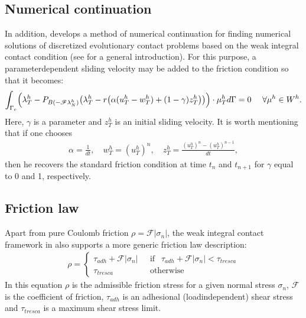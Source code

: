 \documentclass[a4paper,11pt,english]{sphinxmanual}
\begin{document}
\subsection{Numerical continuation}
\label{\detokenize{userdoc/model_contact_friction:numerical-continuation}}
In addition,  develops a method of numerical continuation for finding numerical solutions of discretized evolutionary contact problems based on the weak integral contact condition (see {\hyperref[\detokenize{userdoc/model_continuation:ud-model-continuation}]{}} for a general introduction). For this purpose, a parameter\sphinxhyphen{}dependent sliding velocity may be added to the friction condition so that it becomes:
\begin{equation*}
\begin{split}\displaystyle \int_{\Gamma_c} \Bigl(\lambda^h_T -P_{B(-\mathscr F\lambda^h_N)}\bigl(\lambda^h_T - r\bigl(\alpha(u^h_T-w^h_T)+(1-\gamma)z^h_T\bigr)\bigr)\Bigr)\cdot \mu^h_T d\Gamma = 0 ~~~~ \forall \mu^h \in W^h.\end{split}
\end{equation*}
Here, \(\gamma\) is a parameter and \(z^h_T\) is an initial sliding velocity. It is worth mentioning that if one chooses
\begin{equation*}
\begin{split}\displaystyle \alpha = \frac{1}{dt},\quad w^h_T = (u^h_T)^{n},\quad z^h_T = \frac{(u^h_T)^{n} - (u^h_T)^{n-1}}{dt},\end{split}
\end{equation*}
then he recovers the standard friction condition at time \(t_{n}\) and \(t_{n+1}\) for \(\gamma\) equal to 0 and 1, respectively.


\subsection{Friction law}
\label{\detokenize{userdoc/model_contact_friction:friction-law}}
Apart from pure Coulomb friction \(\rho = {\mathscr F} \left| \sigma_n \right|\),
the weak integral contact framework in  also supports a more generic friction
law description:
\begin{equation*}
\begin{split}\displaystyle \rho = \left\{\begin{array}{ll}
\tau_{adh} + {\mathscr F} \left| \sigma_n \right| &
~~~\mbox{if } ~~ \tau_{adh} + {\mathscr F} \left| \sigma_n \right| < \tau_{tresca} \\
\tau_{tresca} & ~~~\mbox{otherwise}
\end{array}\right.\end{split}
\end{equation*}
In this equation \(\rho\) is the admissible friction stress for a given
normal stress \(\sigma_n\), \({\mathscr F}\) is the coefficient of friction,
\(\tau_{adh}\) is an adhesional (load\sphinxhyphen{}independent) shear stress and
\(\tau_{tresca}\) is a maximum shear stress limit.
\end{document}
